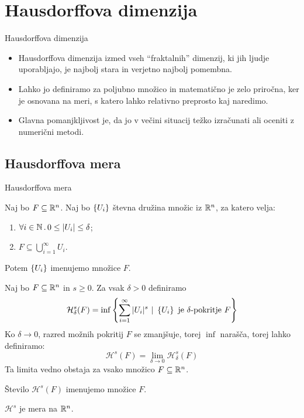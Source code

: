 \documentclass[10pt]{beamer}
\begin{document}
\section{Hausdorffova dimenzija}
\begin{frame}{Hausdorffova dimenzija}
    \begin{itemize}
        \item Hausdorffova dimenzija izmed vseh "`fraktalnih"' dimenzij, ki jih ljudje uporabljajo, je najbolj stara in verjetno najbolj pomembna. 
        \item Lahko jo definiramo za poljubno množico in matematično je zelo priročna, ker je osnovana na meri, s katero lahko relativno preprosto kaj naredimo.
        \item Glavna pomanjkljivost je, da jo v večini situacij težko izračunati ali oceniti z numerični metodi.
    \end{itemize}
\end{frame}

\subsection{Hausdorffova mera}
\begin{frame}[t]{Hausdorffova mera}
     {
        \begin{definicija}
            Naj bo \(F \subseteq \mathbb{R}^n\). Naj bo \(\left\{U_i\right\}\) števna družina množic iz \(\mathbb{R}^n\), za katero velja:
            \begin{enumerate}
                \item \(\forall i \in \mathbb{N} \,.\, 0 \leq |U_i| \leq \delta\);
                \item \(F \subseteq \bigcup_{i=1}^\infty U_i\).
            \end{enumerate}
            Potem \(\left\{U_i\right\}\) imenujemo  množice \(F\).
        \end{definicija}
    }
    \pause
    Naj bo \(F \subseteq \mathbb{R}^n\) in \(s \geq 0\). Za vsak \(\delta > 0\) definiramo 
    \[\mathcal{H}^s_\delta(F) = \inf \left\{\sum_{i=1}^{\infty}|U_i|^s \ | \ \left\{U_i\right\} \ \text{je \(\delta\)-pokritje \(F\)}\right\}\]
    \pause
    Ko \(\delta \to 0\), razred možnih pokritij \(F\) se zmanjšuje, torej \(\inf\) narašča, torej lahko definiramo:
    \[\mathcal{H}^s(F) = \lim_{\delta \to 0} \mathcal{H}^s_\delta(F)\]
    Ta limita vedno obstaja za vsako množico \(F \subseteq \mathbb{R}^n\). 

    \pause    
    Število \(\mathcal{H}^s(F)\) imenujemo  množice \(F\).

    \begin{trditev}
        \(\mathcal{H}^s\) je mera na \(\mathbb{R}^n\).
    \end{trditev}      
\end{frame}
\end{document}
